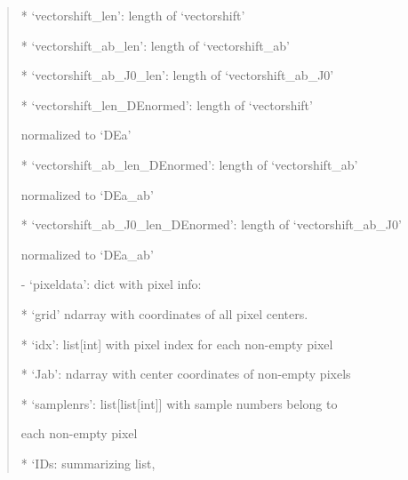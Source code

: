\documentclass[letterpaper,10pt,english]{sphinxmanual}
\begin{document}
\begin{fulllineitems}
\begin{description}
\begin{quote}
\begin{description}
\begin{DUlineblock}{0em}
\begin{DUlineblock}{\DUlineblockindent}
\begin{DUlineblock}{\DUlineblockindent}
\begin{DUlineblock}{\DUlineblockindent}
\begin{DUlineblock}{\DUlineblockindent}
\end{DUlineblock}
\item[] * ‘vectorshift\_len’: length of ‘vectorshift’
\item[] * ‘vectorshift\_ab\_len’: length of ‘vectorshift\_ab’
\item[] * ‘vectorshift\_ab\_J0\_len’: length of ‘vectorshift\_ab\_J0’
\item[] * ‘vectorshift\_len\_DEnormed’: length of ‘vectorshift’ 
\item[]
\begin{DUlineblock}{\DUlineblockindent}
\item[] normalized to ‘DEa’
\end{DUlineblock}
\item[] * ‘vectorshift\_ab\_len\_DEnormed’: length of ‘vectorshift\_ab’ 
\item[]
\begin{DUlineblock}{\DUlineblockindent}
\item[] normalized to ‘DEa\_ab’
\end{DUlineblock}
\item[] * ‘vectorshift\_ab\_J0\_len\_DEnormed’: length of ‘vectorshift\_ab\_J0’ 
\item[]
\begin{DUlineblock}{\DUlineblockindent}
\item[] normalized to ‘DEa\_ab’
\end{DUlineblock}
\end{DUlineblock}
\item[] - ‘pixeldata’: dict with pixel info:
\item[]
\begin{DUlineblock}{\DUlineblockindent}
\item[] * ‘grid’ ndarray with coordinates of all pixel centers.
\item[] * ‘idx’: list{[}int{]} with pixel index for each non-empty pixel
\item[] * ‘Jab’: ndarray with center coordinates of non-empty pixels
\item[] * ‘samplenrs’: list{[}list{[}int{]}{]} with sample numbers belong to 
\item[]
\begin{DUlineblock}{\DUlineblockindent}
\item[] each non-empty pixel
\end{DUlineblock}
\item[] * ‘IDs: summarizing list, 
\item[]
\begin{DUlineblock}{\DUlineblockindent}

\end{DUlineblock}
\end{DUlineblock}
\end{DUlineblock}
\end{DUlineblock}
\end{DUlineblock}
\end{description}
\end{quote}
\end{description}
\end{fulllineitems}
\end{document}
